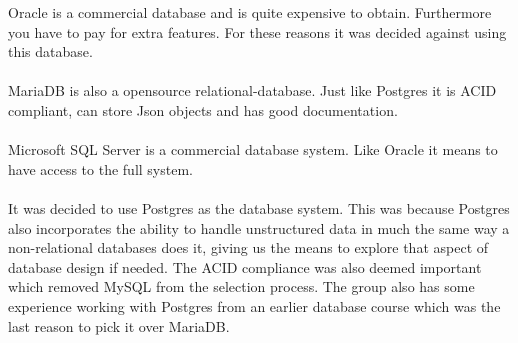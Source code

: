 Oracle is a commercial database and is quite expensive to obtain\cite{oracle}.
Furthermore you have to pay for extra features.
For these reasons it was decided against using this database.
\\
\\
MariaDB is also a opensource relational-database\cite{MariaDB}.
Just like Postgres it is ACID compliant, can store Json objects and has good documentation.
\\
\\
Microsoft SQL Server is a commercial database system\cite{MSSQLSERVER}.
Like Oracle it means to have access to the full system.
\\
\\
It was decided to use Postgres as the database system.
This was because Postgres also incorporates the ability to handle unstructured data in much the same way a non-relational databases does it, giving us the means to explore that aspect of database design if needed.
The ACID compliance was also deemed important which removed MySQL from the selection process. 
The group also has some experience working with Postgres from an earlier database course which was the last reason to pick it over MariaDB.
